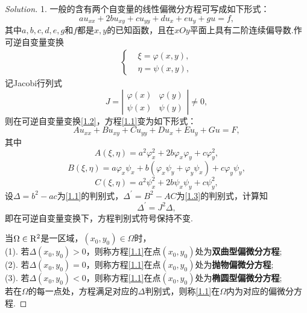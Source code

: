 \documentclass[cn,hazy,blue,14pt,screen]{elegantnote}
\begin{document}
\begin{example}
\begin{proof}[Solution]
			1. 一般的含有两个自变量的线性偏微分方程可写成如下形式：
			\[au_{xx}+2bu_{xy}+cu_{yy}+du_x +eu_y +gu=f,\label{1.1} \tag{1.1}\]			
			其中$a,b,c,d,e,g$和$f$都是$x,y$的已知函数，且在$xOy$平面上具有二阶连续偏导数.作可逆自变量变换
			\[\begin{array}{l}
			\left\{\begin{aligned}
			&\xi=\varphi(x,y),\\
			&\eta=\psi(x,y), 
			\end{aligned}\right.
			\end{array}
			\label{1.2} \tag{1.2}
			\] 
			记Jacobi行列式
			\[J=\left|
			\begin{array}{cc}
				\varphi(x) & \varphi(y) \\ 
				\psi(x) & \psi(y)
			\end{array} \right| \ne 0,
			\]
			则在可逆自变量变换\eqref{1.2}，方程\eqref{1.1}变为如下形式：
			\[
			Au_{xx}+Bu_{xy}+Cu_{yy}+Du_x+Eu_y+Gu=F,
			\label{1.3} \tag{1.3}
			\]
			其中
			\[
			A(\xi ,\eta)=a^2\varphi^2_x+2b\varphi_x\varphi_y+c\varphi^2_y,
			\label{1.4} \tag{1.4}
			\]
			\[
			B(\xi ,\eta)=a\varphi_x \psi_x +b (\varphi_x\psi_y+\varphi_y \psi_x) +c\varphi_y \psi_y,
			\label{1.5} \tag{1.5}
			\]
			\[
			C(\xi ,\eta)=a^2\psi^2_x+2b\psi_x\psi_y+c\psi^2_y,
			\label{1.6} \tag{1.6}
			\]			
			设$\Delta=b^2-ac$为\eqref{1.1}的判别式，$\Delta^{\prime}=B^2-AC$为\eqref{1.3}的判别式，计算知
			\[
			\Delta^{\prime}=J^2\Delta,
			\label{1.7} \tag{1.7}
			\]			
			即在可逆自变量变换下，方程判别式符号保持不变.
			
			当$\Omega \in {\rm R}^2$是一区域，$(x_0,y_0)\in \Omega$时，\\
			(1). 若$\Delta(x_0,y_0)>0$，则称方程\eqref{1.1}在点$(x_0,y_0)$处为\textbf{双曲型偏微分方程};\\
			(2). 若$\Delta(x_0,y_0)=0$，则称方程\eqref{1.1}在点$(x_0,y_0)$处为\textbf{抛物偏微分方程};\\
			(3). 若$\Delta(x_0,y_0)<0$，则称方程\eqref{1.1}在点$(x_0,y_0)$处为\textbf{椭圆型偏微分方程};\\
			若在$\Omega$的每一点处，方程满足对应的$\Delta$判别式，则称\eqref{1.1}在$\Omega$内为对应的偏微分方程.
			

\end{proof}
\end{example}
\end{document}
